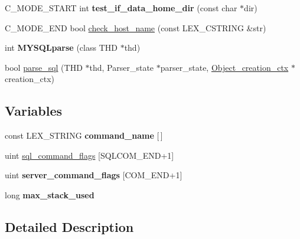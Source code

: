 \begin{DoxyCompactItemize}
\item 
\mbox{\label{group__Runtime__Environment_ga35590aeb74bdebbccac86b889a2cb7d1}} 
C\+\_\+\+M\+O\+D\+E\+\_\+\+S\+T\+A\+RT int {\bfseries test\+\_\+if\+\_\+data\+\_\+home\+\_\+dir} (const char $\ast$dir)
\item 
C\+\_\+\+M\+O\+D\+E\+\_\+\+E\+ND bool \mbox{\hyperlink{group__Runtime__Environment_ga83c28ce3e415fe976a0d40cc4b4eef81}{check\+\_\+host\+\_\+name}} (const L\+E\+X\+\_\+\+C\+S\+T\+R\+I\+NG \&str)
\item 
\mbox{\label{group__Runtime__Environment_ga064577e9942acfdd4ec6383b30792475}} 
int {\bfseries M\+Y\+S\+Q\+Lparse} (class T\+HD $\ast$thd)
\item 
bool \mbox{\hyperlink{group__Runtime__Environment_gabb1400ab6d81b2c3eb496d66df4d7674}{parse\+\_\+sql}} (T\+HD $\ast$thd, Parser\+\_\+state $\ast$parser\+\_\+state, \mbox{\hyperlink{classObject__creation__ctx}{Object\+\_\+creation\+\_\+ctx}} $\ast$creation\+\_\+ctx)
\end{DoxyCompactItemize}
\subsection*{Variables}
\begin{DoxyCompactItemize}
\item 
\mbox{\label{group__Runtime__Environment_ga0fff36dbb3be1083486e5226dbe8267e}} 
const L\+E\+X\+\_\+\+S\+T\+R\+I\+NG {\bfseries command\+\_\+name} \mbox{[}$\,$\mbox{]}
\item 
uint \mbox{\hyperlink{group__Runtime__Environment_ga2b520658dfe2259770e9037c640d5399}{sql\+\_\+command\+\_\+flags}} \mbox{[}S\+Q\+L\+C\+O\+M\+\_\+\+E\+ND+1\mbox{]}
\item 
\mbox{\label{group__Runtime__Environment_gabb2a8fda5bafb784dd61891fb58c9274}} 
uint {\bfseries server\+\_\+command\+\_\+flags} \mbox{[}C\+O\+M\+\_\+\+E\+ND+1\mbox{]}
\item 
\mbox{\label{group__Runtime__Environment_ga909f1c5c4bc6d72a01f18503b25d2e07}} 
long {\bfseries max\+\_\+stack\+\_\+used}
\end{DoxyCompactItemize}


\subsection{Detailed Description}


